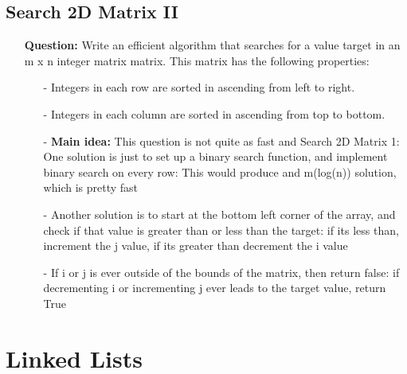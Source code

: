 \documentclass[12pt]{article}
\begin{document}
\subsection{Search 2D Matrix II}
\begin{enumerate}
  \item[] \textbf{Question:} Write an efficient algorithm that searches for a value target in an m x n integer matrix matrix. This matrix has the following properties:

  \begin{enumerate}
    \item[-] Integers in each row are sorted in ascending from left to right.
    \item[-] Integers in each column are sorted in ascending from top to bottom.
  \end{enumerate}

    \begin{enumerate}
      \item[-] \textbf{Main idea:} This question is not quite as fast and Search 2D Matrix 1: One solution is just to set up a binary search function, and implement binary search on every row: This would produce and m(log(n)) solution, which is pretty fast
      \item[-] Another solution is to start at the bottom left corner of the array, and check if that value is greater than or less than the target: if its less than, increment the j value, if its greater than decrement the i value
      \item[-] If i or j is ever outside of the bounds of the matrix, then return false: if decrementing i or incrementing j ever leads to the target value, return True

    \end{enumerate}
\end{enumerate}





\section{Linked Lists}
\end{document}
